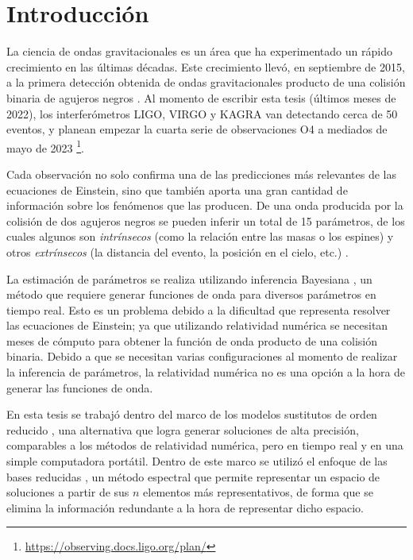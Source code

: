 \chapter{Introducción}

 
La ciencia de ondas gravitacionales es un área que ha experimentado un rápido crecimiento en las últimas décadas. Este crecimiento llevó, en septiembre de 2015, a la primera detección obtenida de ondas gravitacionales producto de una colisión binaria de agujeros negros \cite{https://doi.org/10.48550/arxiv.1607.05251, LIGOScientific:2016aoc}. Al momento de escribir esta tesis (últimos meses de 2022), los interferómetros LIGO, VIRGO y KAGRA van detectando cerca de 50 eventos, y planean empezar la cuarta serie de observaciones O4 a mediados de mayo de 2023 \footnote{\url{https://observing.docs.ligo.org/plan/}}.


Cada observación no solo confirma una de las predicciones más relevantes de las ecuaciones de Einstein, sino que también aporta una gran cantidad de información sobre los fenómenos que las producen. De una onda producida por la colisión de dos agujeros negros se pueden inferir un total de 15 parámetros, de los cuales algunos son \textit{intrínsecos} (como la relación entre las masas o los espines) y otros \textit{extrínsecos} (la distancia del evento, la posición en el cielo, etc.) \cite{Veitch_2015}.


La estimación de parámetros se realiza utilizando inferencia Bayesiana \cite{Thrane_2019}, un método que requiere generar funciones de onda para diversos parámetros en tiempo real. Esto es un problema debido a la dificultad que representa resolver las ecuaciones de Einstein; ya que utilizando relatividad numérica se necesitan meses de cómputo para obtener la función de onda producto de una colisión binaria. Debido a que se necesitan varias configuraciones al momento de realizar la inferencia de parámetros, la relatividad numérica no es una opción a la hora de generar las funciones de onda. 

En esta tesis se trabajó dentro del marco de los modelos sustitutos de orden reducido \cite{Field_2014, Tiglio:2021ysj}, una alternativa que logra generar soluciones de alta precisión, comparables a los métodos de relatividad numérica, pero en tiempo real y en una simple computadora portátil. Dentro de este marco se utilizó el enfoque de las bases reducidas \cite{rb0book, doi:10.1137/09075250X, PhysRevLett.106.221102, 10.1115/1.1448332, rb1book}, un método espectral que permite representar un espacio de soluciones a partir de sus $n$ elementos más representativos, de forma que se elimina la información redundante a la hora de representar dicho espacio.


